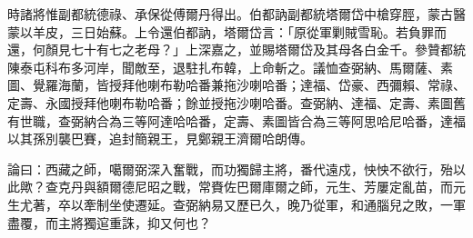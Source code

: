 \begin{pinyinscope}
時諸將惟副都統德祿、承保從傅爾丹得出。伯都訥副都統塔爾岱中槍穿脛，蒙古醫蒙以羊皮，三日始蘇。上令還伯都訥，塔爾岱言：「原從軍剿賊雪恥。若負罪而還，何顏見七十有七之老母？」上深嘉之，並賜塔爾岱及其母各白金千。參贊都統陳泰屯科布多河岸，聞敵至，退駐扎布韓，上命斬之。議恤查弼納、馬爾薩、素圖、覺羅海蘭，皆授拜他喇布勒哈番兼拖沙喇哈番；達福、岱豪、西彌賴、常祿、定壽、永國授拜他喇布勒哈番；餘並授拖沙喇哈番。查弼納、達福、定壽、素圖舊有世職，查弼納合為三等阿達哈哈番，定壽、素圖皆合為三等阿思哈尼哈番，達福以其孫別襲巴賽，追封簡親王，見鄭親王濟爾哈朗傳。

論曰：西藏之師，噶爾弼深入奮戰，而功獨歸主將，番代遠戍，怏怏不欲行，殆以此歟？查克丹與額爾德尼昭之戰，常賚佐巴爾庫爾之師，元生、芳屢定亂苗，而元生尤著，卒以牽制坐使遷延。查弼納易又歷已久，晚乃從軍，和通腦兒之敗，一軍盡覆，而主將獨逭重誅，抑又何也？


\end{pinyinscope}